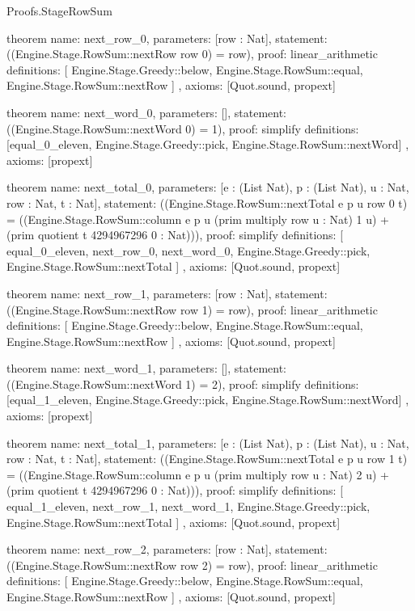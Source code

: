\begin{lexlean}{Proofs.StageRowSum}
\begin{semanticmodule}
theorem{
  name: next_row_0,
  parameters: [row : Nat],
  statement: ((Engine.Stage.RowSum::nextRow row 0) = row),
  proof: linear_arithmetic{
    definitions: [
      Engine.Stage.Greedy::below,
      Engine.Stage.RowSum::equal,
      Engine.Stage.RowSum::nextRow
    ]
  },
  axioms: [Quot.sound, propext]
}

theorem{
  name: next_word_0,
  parameters: [],
  statement: ((Engine.Stage.RowSum::nextWord 0) = 1),
  proof: simplify{
    definitions: [equal_0_eleven, Engine.Stage.Greedy::pick, Engine.Stage.RowSum::nextWord]
  },
  axioms: [propext]
}

theorem{
  name: next_total_0,
  parameters: [e : (List Nat), p : (List Nat), u : Nat, row : Nat, t : Nat],
  statement: ((Engine.Stage.RowSum::nextTotal e p u row 0 t) = ((Engine.Stage.RowSum::column e p u (prim multiply row u : Nat) 1 u) + (prim quotient t 4294967296 0 : Nat))),
  proof: simplify{
    definitions: [
      equal_0_eleven,
      next_row_0,
      next_word_0,
      Engine.Stage.Greedy::pick,
      Engine.Stage.RowSum::nextTotal
    ]
  },
  axioms: [Quot.sound, propext]
}

theorem{
  name: next_row_1,
  parameters: [row : Nat],
  statement: ((Engine.Stage.RowSum::nextRow row 1) = row),
  proof: linear_arithmetic{
    definitions: [
      Engine.Stage.Greedy::below,
      Engine.Stage.RowSum::equal,
      Engine.Stage.RowSum::nextRow
    ]
  },
  axioms: [Quot.sound, propext]
}

theorem{
  name: next_word_1,
  parameters: [],
  statement: ((Engine.Stage.RowSum::nextWord 1) = 2),
  proof: simplify{
    definitions: [equal_1_eleven, Engine.Stage.Greedy::pick, Engine.Stage.RowSum::nextWord]
  },
  axioms: [propext]
}

theorem{
  name: next_total_1,
  parameters: [e : (List Nat), p : (List Nat), u : Nat, row : Nat, t : Nat],
  statement: ((Engine.Stage.RowSum::nextTotal e p u row 1 t) = ((Engine.Stage.RowSum::column e p u (prim multiply row u : Nat) 2 u) + (prim quotient t 4294967296 0 : Nat))),
  proof: simplify{
    definitions: [
      equal_1_eleven,
      next_row_1,
      next_word_1,
      Engine.Stage.Greedy::pick,
      Engine.Stage.RowSum::nextTotal
    ]
  },
  axioms: [Quot.sound, propext]
}

theorem{
  name: next_row_2,
  parameters: [row : Nat],
  statement: ((Engine.Stage.RowSum::nextRow row 2) = row),
  proof: linear_arithmetic{
    definitions: [
      Engine.Stage.Greedy::below,
      Engine.Stage.RowSum::equal,
      Engine.Stage.RowSum::nextRow
    ]
  },
  axioms: [Quot.sound, propext]
}


\end{semanticmodule}
\end{lexlean}

